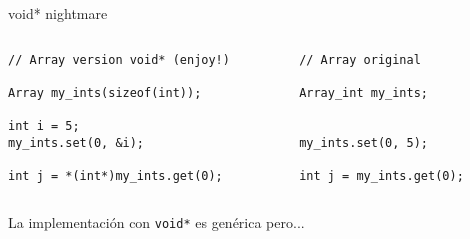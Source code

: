 \begin{frame}[fragile]{void* nightmare}
   \begin{columns}[t]
      \begin{column}{.55\linewidth}
         \begin{lstlisting}[style=normal,linebackgroundcolor={%
         \only<1>{\def\lst@linebgrdcmd####1####2####3{}}%
         \btLstHLB<2>{6}% uso de literal 
         \btLstHLB<3>{8}% copia
         \btLstHLB<4>{8}% casteo
   }]
// Array version void* (enjoy!)

Array my_ints(sizeof(int));

int i = 5;
my_ints.set(0, &i);

int j = *(int*)my_ints.get(0);
         \end{lstlisting}
      \end{column}
      \begin{column}{.40\linewidth}
         \begin{lstlisting}[style=normalnonumbers,linebackgroundcolor={%
         \only<1>{\def\lst@linebgrdcmd####1####2####3{}}%
         \btLstHLB<2>{6}% uso de literal 
         \btLstHLB<3-4>{8}% copia y casteo
   }]
// Array original

Array_int my_ints;


my_ints.set(0, 5);

int j = my_ints.get(0);
         \end{lstlisting}
      \end{column}
   \end{columns}
\vphantom{X}
La implementaci\'on con \lstinline[style=normal]!void*! es gen\'erica pero...\\
\end{frame}

